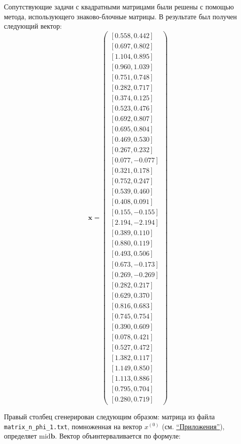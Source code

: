 Сопутствующие задачи с квадратными матрицами были решены с помощью метода, использующего знаково-блочные матрицы. В результате был получен следующий вектор:
\begin{equation}
\mathbf{x}=
\begin{pmatrix}
[0.558, 0.442] \\
[0.697, 0.802] \\
[1.104, 0.895] \\
[0.960, 1.039] \\
[0.751, 0.748] \\
[0.282, 0.717] \\
[0.374, 0.125] \\
[0.523, 0.476] \\
[0.692, 0.807] \\
[0.695, 0.804] \\
[0.469, 0.530] \\
[0.267, 0.232] \\
[0.077, -0.077] \\
[0.321, 0.178] \\
[0.752, 0.247] \\
[0.539, 0.460] \\
[0.408, 0.091] \\
[0.155, -0.155] \\
[2.194, -2.194] \\
[0.389, 0.110] \\
[0.880, 0.119] \\
[0.493, 0.506] \\
[0.673, -0.173] \\
[0.269, -0.269] \\
[0.282, 0.217] \\
[0.629, 0.370] \\
[0.816, 0.683] \\
[0.745, 0.754] \\
[0.390, 0.609] \\
[0.078, 0.421] \\
[0.527, 0.472] \\
[1.382, 0.117] \\
[1.149, 0.850] \\
[1.113, 0.886] \\
[0.795, 0.704] \\
[0.280, 0.719]
\end{pmatrix}
\end{equation}

Правый столбец сгенерирован следующим образом: матрица из файла \texttt{matrix\_n\_phi\_1.txt}, помноженная на вектор $x^{(0)}$ (см. \hyperref[app]{``Приложения''}), определяет $\mathrm{mid} \mathbf{b}$. Вектор объинтерваливается по формуле:

